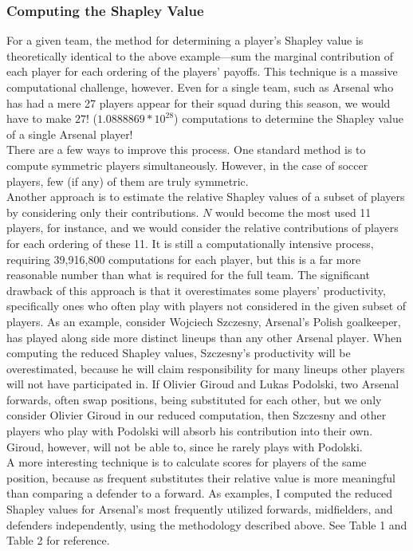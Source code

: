\documentclass[a4paper,10pt]{article}
\newcommand{\br}{\\[10pt]}
\begin{document}
  \subsubsection*{Computing the Shapley Value}
  For a given team, the method for determining a player's Shapley value is theoretically identical to the above example---sum the marginal contribution of each player for each ordering of the players' payoffs. This technique is a massive computational challenge, however. Even for a single team, such as Arsenal who has had a mere 27 players appear for their squad during this season, we would have to make $27!$ ($1.0888869 * 10^{28}$) computations to determine the Shapley value of a single Arsenal player!
  \br
  There are a few ways to improve this process. One standard method is to compute symmetric players simultaneously. However, in the case of soccer players, few (if any) of them are truly symmetric.
  \br
  Another approach is to estimate the relative Shapley values of a subset of players by considering only their contributions. $N$ would become the most used 11 players, for instance, and we would consider the relative contributions of players for each ordering of these 11. It is still a computationally intensive process, requiring 39,916,800 computations for each player, but this is a far more reasonable number than what is required for the full team. The significant drawback of this approach is that it overestimates some players' productivity, specifically ones who often play with players not considered in the given subset of players. As an example, consider Wojciech Szczesny, Arsenal's Polish goalkeeper, has played along side more distinct lineups than any other Arsenal player. When computing the reduced Shapley values, Szczesny's productivity will be overestimated, because he will claim responsibility for many lineups other players will not have participated in. If Olivier Giroud and Lukas Podolski, two Arsenal forwards, often swap positions, being substituted for each other, but we only consider Olivier Giroud in our reduced computation, then Szczesny and other players who play with Podolski will absorb his contribution into their own. Giroud, however, will not be able to, since he rarely plays with Podolski.
  \br
  A more interesting technique is to calculate scores for players of the same position, because as frequent substitutes their relative value is more meaningful than comparing a defender to a forward. As examples, I computed the reduced Shapley values for Arsenal's most frequently utilized forwards, midfielders, and defenders independently, using the methodology described above. See Table 1 and Table 2 for reference.
\end{document}
